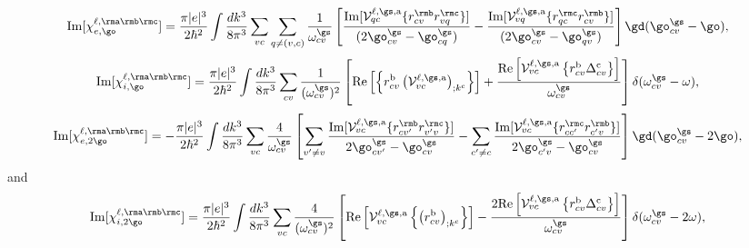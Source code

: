 \begin{equation}\label{calvimchiewn}
\mathrm{Im}[\chi^{\ell,\rma\rmb\rmc}_{e,\go}]= 
\frac{\pi |e|^3}{2\hbar^2}
\int \frac{dk^3}{8\pi^3}
\sum_{vc}\sum_{q\neq(v,c)}\frac{1}{\omega^\gs_{cv}}
\left[
\frac{\mathrm{Im}[\mathcal{V}^{\ell,\gs,\text{a}}_{qc}\{r^{\rmb}_{cv}r^{\rmc}_{vq}\}]}
{(2\go^\gs_{cv}-\go^\gs_{cq})} 
-\frac{\mathrm{Im}[\mathcal{V}^{\ell,\gs,\text{a}}_{vq}\{r^{\rmc}_{qc}r^{\rmb}_{cv}\}]}
{(2\go^\gs_{cv}-\go^\gs_{qv})}
\right]\gd(\go^\gs_{cv}-\go),
\end{equation}  
\begin{equation}\label{calvimchiwn}
\mathrm{Im}[\chi^{\ell,\rma\rmb\rmc}_{i,\go}]= 
\frac{\pi\vert e\vert^3}{2\hbar^2}
\int \frac{dk^3}{8\pi^3}
\sum_{cv}\frac{1}{(\omega^\gs_{cv})^{2}}
\left[
\mathrm{Re}\left[\left\{r^{\text{b}}_{cv}\left(\mathcal{V}^{\ell,\gs,\text{a}}_{vc}\right)_{;k^{\text{c}}}\right\}\right]
+\frac{\mathrm{Re}\left[\mathcal{V}^{\ell,\gs,\text{a}}_{vc}\left\{r^{\text{b}}_{cv}
\Delta^{\text{c}}_{cv}\right\}\right]}{\omega^\gs_{cv}} 
\right]\delta(\omega^\gs_{cv}-\omega),
\end{equation}
\begin{equation}\label{calvimchie2wn}
\mathrm{Im}[\chi^{\ell,\rma\rmb\rmc}_{e,2\go}]= 
-\frac{\pi |e|^3}{2\hbar^2}
\int \frac{dk^3}{8\pi^3}
\sum_{vc}\frac{4}{\omega^\gs_{cv}}
\left[
\sum_{v'\ne
  v}\frac{\mathrm{Im}[\mathcal{V}^{\ell,\gs,\text{a}}_{vc}\{r^{\rmb}_{cv'}r^{\rmc}_{v'v}\}]}
{2\go^\gs_{cv'}-\go^\gs_{cv}}
- \sum_{c'\ne
  c}\frac{\mathrm{Im}[\mathcal{V}^{\ell,\gs,\text{a}}_{vc}\{r^{\rmc}_{cc'}r^{\rmb}_{c'v}\}]}
{2\go^\gs_{c'v}-\go^\gs_{cv}}
\right]\gd(\go^\gs_{cv}-2\go),
\end{equation}
and
\begin{equation}\label{calvimchi2wn}
\mathrm{Im}[\chi^{\ell,\rma\rmb\rmc}_{i,2\go}]= 
 \frac{\pi \vert
   e\vert^{3}}{2\hbar^2}
\int \frac{dk^3}{8\pi^3}
\sum_{vc}\frac{4}{(\omega^\gs_{cv})^{2}}
\left[\mathrm{Re}\left[\mathcal{V}^{\ell,\gs,\text{a}}_{vc}\left\{\left(r^{\text{b}}_{cv}\right)_{;k^{\text{c}}}
\right\}\right] -
\frac{2\mathrm{Re}\left[\mathcal{V}^{\ell,\gs,\text{a}}_{vc}\left\{r^{\text{b}}_{cv}
\Delta^{\text{c}}_{cv}\right\}\right]}{\omega^\gs_{cv}}\right]\delta(\omega^\gs_{cv}-2\omega)
,
\end{equation}

